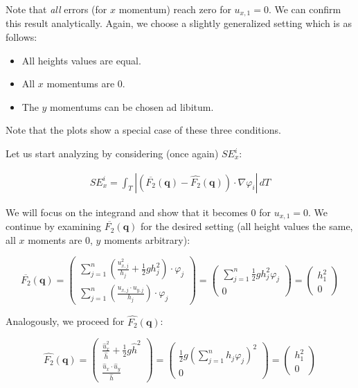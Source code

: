 \documentclass{article}
\renewcommand{\phi}{\varphi}
\begin{document}
Note that \emph{all} errors (for $x$ momentum) reach zero for $u_{x,1} = 0$. We can confirm this result analytically. Again, we choose a slightly generalized setting which is as follows:

\begin{itemize}
\item All heights values are equal.
\item All $x$ momentums are 0.
\item The $y$ momentums can be chosen ad libitum.
\end{itemize}

Note that the plots show a special case of these three conditions.

Let us start analyzing by considering (once again) $SE_x^i$:

\begin{align*}
  SE_x^i = \int_T \left| \left(\overline{F_2}(\mathbf{q}) - \widehat{F_2}(\mathbf{q})\right) \cdot \nabla \phi_i \right|\, dT
\end{align*}

We will focus on the integrand and show that it becomes 0 for $u_{x,1}=0$. We continue by examining $\overline{F_2}(\mathbf{q})$ for the desired setting (all height values the same, all $x$ moments are 0, $y$ moments arbitrary):

\begin{equation}
  \label{eq:1}
  \overline{F_2}(\mathbf{q}) =
  \begin{pmatrix}
    \sum_{j=1}^n \left( \frac{u_{x,j}^2}{h_j} + \frac{1}{2} g h_j^2 \right) \cdot \phi_j \\
    \sum_{j=1}^n \left( \frac{u_{x,j}\cdot u_{y,j}}{h_j} \right) \cdot \phi_j
  \end{pmatrix} =
  \begin{pmatrix}
    \sum_{j=1}^n \frac{1}{2} g h_j^2 \phi_j \\
    0
  \end{pmatrix} =
  \begin{pmatrix}
    h_1^2 \\ 0
  \end{pmatrix}
\end{equation}

Analogously, we proceed for $\widehat{F_2}(\mathbf{q})$:

\begin{equation}
  \label{eq:2}
  \widehat{F_2}(\mathbf{q}) =
  \begin{pmatrix}
    \frac{\widehat{u}_x^2}{\widehat h} + \frac{1}{2} g \widehat h ^2 \\
    \frac{\widehat u_x \cdot \widehat u_y}{\widehat h}
  \end{pmatrix} =
  \begin{pmatrix}
    \frac{1}{2} g \left( \sum_{j=1}^n h_j \phi_j \right) ^2 \\
    0
  \end{pmatrix} =
  \begin{pmatrix}
    h_1^2 \\ 0
  \end{pmatrix}
\end{equation}
\end{document}

